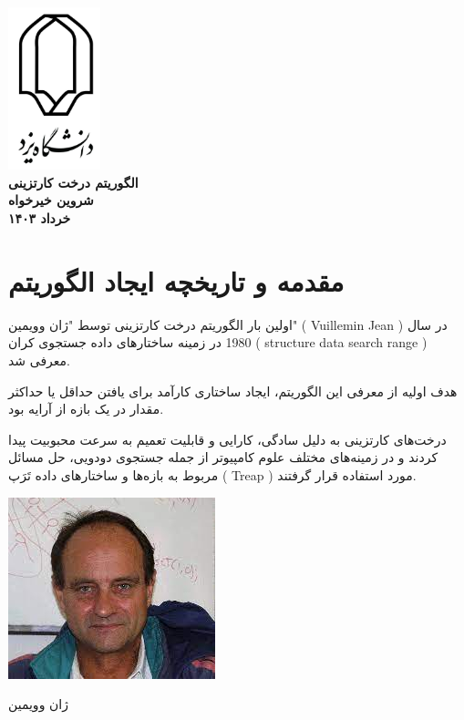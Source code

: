 \documentclass{article}
\begin{document}
\begin{titlepage}
    \centering
    \includegraphics[width=0.2\textwidth]{logoYazdUniversity.png}\\[1cm] 
    \textsc{\Large \bfseries الگوریتم درخت کارتزینی}\\[0.5cm] 
    \textbf{شروین خیرخواه}\\[0.5cm] 
    \textbf{خرداد ۱۴۰۳}\\[0.5cm]
\end{titlepage}
\tableofcontents
\newpage
\section{مقدمه و تاریخچه ایجاد الگوریتم}
اولین بار الگوریتم درخت کارتزینی توسط "ژان وویمین" (  Vuillemin Jean ) در سال 1980 در زمینه ساختارهای داده جستجوی کران ( structure data search range ) معرفی شد.

هدف اولیه از معرفی این الگوریتم، ایجاد ساختاری کارآمد برای یافتن حداقل یا حداکثر مقدار در یک بازه از آرایه بود.

درخت‌های کارتزینی به دلیل سادگی، کارایی و قابلیت تعمیم به سرعت محبوبیت پیدا کردند و در زمینه‌های مختلف علوم کامپیوتر از جمله جستجوی دودویی، حل مسائل مربوط به بازه‌ها و ساختارهای داده تَرَپ ( Treap ) مورد استفاده قرار گرفتند.

\begin{center}
    \includegraphics[scale=0.7]{firsti.jpg}
\end{center}
\begin{center}
    \small ژان وویمین
\end{center}
\end{document}
